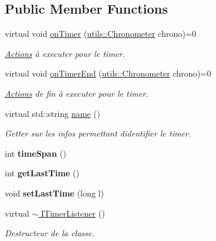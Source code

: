 \subsection*{Public Member Functions}
\begin{DoxyCompactItemize}
\item 
\mbox{\label{classITimerListener_a0d974556acf49d43add83ffabb25abe8}} 
virtual void \hyperlink{classITimerListener_a0d974556acf49d43add83ffabb25abe8}{on\+Timer} (\hyperlink{classutils_1_1Chronometer}{utils\+::\+Chronometer} chrono)=0
\begin{DoxyCompactList}\small\item\em \hyperlink{classActions}{Actions} à executer pour le timer. \end{DoxyCompactList}\item 
\mbox{\label{classITimerListener_a0004b567b000eef6df12d9d970909142}} 
virtual void \hyperlink{classITimerListener_a0004b567b000eef6df12d9d970909142}{on\+Timer\+End} (\hyperlink{classutils_1_1Chronometer}{utils\+::\+Chronometer} chrono)=0
\begin{DoxyCompactList}\small\item\em \hyperlink{classActions}{Actions} de fin à executer pour le timer. \end{DoxyCompactList}\item 
\mbox{\label{classITimerListener_a1fb13795b7ae788210f5e6bce5a9aeb0}} 
virtual std\+::string \hyperlink{classITimerListener_a1fb13795b7ae788210f5e6bce5a9aeb0}{name} ()
\begin{DoxyCompactList}\small\item\em Getter sur les infos permettant d\textquotesingle{}identifier le timer. \end{DoxyCompactList}\item 
\mbox{\label{classITimerListener_a746c0ceee4eb354754d2e90c5638454c}} 
int {\bfseries time\+Span} ()
\item 
\mbox{\label{classITimerListener_afdef8ccebdbaf3102d64df87951def4c}} 
int {\bfseries get\+Last\+Time} ()
\item 
\mbox{\label{classITimerListener_a459eb8a49927fb50bef7965140a196b7}} 
void {\bfseries set\+Last\+Time} (long l)
\item 
\mbox{\label{classITimerListener_a5eb6e3cce242f255ee667c69c5d4041c}} 
virtual \hyperlink{classITimerListener_a5eb6e3cce242f255ee667c69c5d4041c}{$\sim$ I\+Timer\+Listener} ()
\begin{DoxyCompactList}\small\item\em Destructeur de la classe. \end{DoxyCompactList}\end{DoxyCompactItemize}
